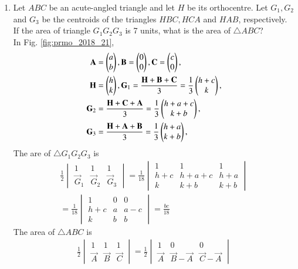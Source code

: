 \documentclass[journal,12pt,twocolumn]{IEEEtran}
\renewcommand\thesection{\arabic{section}}
\begin{document}
\begin{enumerate}[label=\thesection.\arabic*,ref=\thesection.\theenumi]
\item  Let $ABC$ be an acute-angled triangle and let $H$ be its orthocentre. Let $G_1, G_2$ and $G_3$ be the centroids of the triangles $HBC, HCA$ and $HAB$, respectively. If the area of triangle $G_1G_2G_3$ is 7 units, what is the area of $\triangle ABC$?
\\
\solution In Fig. \eqref{fig:prmo_2018_21},
\begin{align}
\mathbf{A} &= \begin{pmatrix}a\\b\end{pmatrix},
\mathbf{B} = \begin{pmatrix}0\\0\end{pmatrix},
\mathbf{C} = \begin{pmatrix}c\\0\end{pmatrix},
\\
\mathbf{H} &= \begin{pmatrix}h\\k\end{pmatrix},
\mathbf{G}_1 = \frac{\mathbf{H}+\mathbf{B}+\mathbf{C}}{3}=\frac{1}{3}\begin{pmatrix}h+c\\k\end{pmatrix},
\\
\mathbf{G}_2 &= \frac{\mathbf{H}+\mathbf{C}+\mathbf{A}}{3}=\frac{1}{3}\begin{pmatrix}h+a+c\\k+b\end{pmatrix},
\\
\mathbf{G}_3 &= \frac{\mathbf{H}+\mathbf{A}+\mathbf{B}}{3}=\frac{1}{3}\begin{pmatrix}h+a\\k+b\end{pmatrix},
\end{align}
%
The are of $\triangle G_1G_2G_3$ is
\begin{align}
\frac{1}{2}
\begin{vmatrix}
1 & 1 & 1
\\
\vec{G}_1 &
\vec{G}_2 &
\vec{G}_3 
\end{vmatrix}
=
\frac{1}{18}
\begin{vmatrix}
1 & 1 & 1
\\
h+c & h+a+c & h+a
\\
k & k+b & k+b
\end{vmatrix}
\\
=
\frac{1}{18}
\begin{vmatrix}
1 & 0 & 0
\\
h+c & a & a-c
\\
k & b & b
\end{vmatrix}
=\frac{bc}{18}
\end{align}
%
The area of $\triangle ABC$ is
\begin{align}
\frac{1}{2}
\begin{vmatrix}
1 & 1 & 1
\\
\vec{A} & \vec{B} & \vec{C}
\end{vmatrix}
=
\frac{1}{2}
\begin{vmatrix}
1 & 0 & 0
\\
\vec{A} & \vec{B}-\vec{A} & \vec{C}-\vec{A}
\end{vmatrix}

\end{align}
\end{enumerate}
\end{document}
